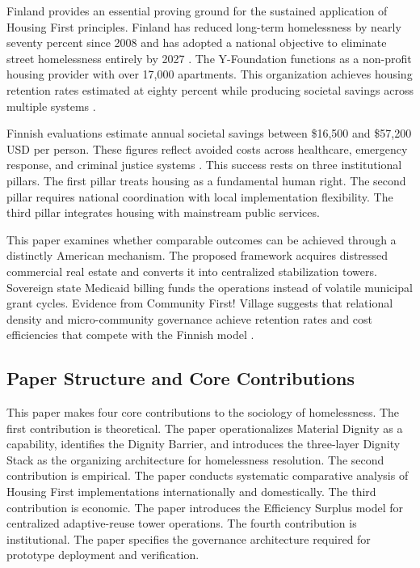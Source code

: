 \documentclass[12pt, letterpaper]{article}
\begin{document}
Finland provides an essential proving ground for the sustained application of Housing First principles. Finland has reduced long-term homelessness by nearly seventy percent since 2008 and has adopted a national objective to eliminate street homelessness entirely by 2027 \citep{sdg16plus_2023}. The Y-Foundation functions as a non-profit housing provider with over 17,000 apartments. This organization achieves housing retention rates estimated at eighty percent while producing societal savings across multiple systems \citep{the_atlas_2023}.

Finnish evaluations estimate annual societal savings between \$16,500 and \$57,200 USD per person. These figures reflect avoided costs across healthcare, emergency response, and criminal justice systems \citep{sdg16plus_2023, yfoundation_2024}. This success rests on three institutional pillars. The first pillar treats housing as a fundamental human right. The second pillar requires national coordination with local implementation flexibility. The third pillar integrates housing with mainstream public services.

This paper examines whether comparable outcomes can be achieved through a distinctly American mechanism. The proposed framework acquires distressed commercial real estate and converts it into centralized stabilization towers. Sovereign state Medicaid billing funds the operations instead of volatile municipal grant cycles. Evidence from Community First! Village suggests that relational density and micro-community governance achieve retention rates and cost efficiencies that compete with the Finnish model \citep{mlf_2024}.

\subsection{Paper Structure and Core Contributions}

This paper makes four core contributions to the sociology of homelessness. The first contribution is theoretical. The paper operationalizes Material Dignity as a capability, identifies the Dignity Barrier, and introduces the three-layer Dignity Stack as the organizing architecture for homelessness resolution. The second contribution is empirical. The paper conducts systematic comparative analysis of Housing First implementations internationally and domestically. The third contribution is economic. The paper introduces the Efficiency Surplus model for centralized adaptive-reuse tower operations. The fourth contribution is institutional. The paper specifies the governance architecture required for prototype deployment and verification.
\end{document}
